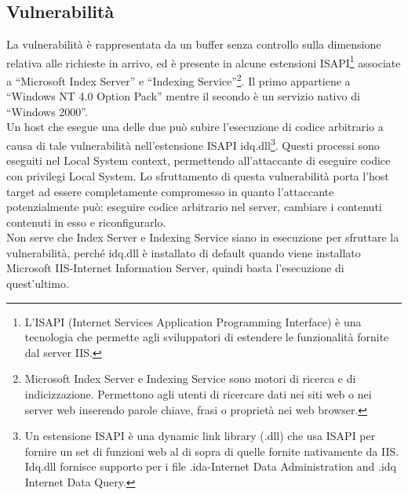 \subsection{Vulnerabilità}
La vulnerabilità è rappresentata da un buffer senza controllo sulla dimensione relativa alle richieste in arrivo, ed è presente in alcune estensioni ISAPI\footnote{L’ISAPI (Internet Services Application Programming Interface) è una tecnologia che permette agli sviluppatori di estendere le funzionalità fornite dal server IIS.} associate a “Microsoft Index Server” e “Indexing Service”\footnote{Microsoft Index Server e Indexing Service sono motori di ricerca e di indicizzazione. Permettono agli utenti di ricercare dati nei siti web o nei server web inserendo parole chiave, frasi o proprietà nei web browser.}. Il primo appartiene a “Windows NT 4.0 Option Pack” mentre il secondo è un servizio nativo di “Windows 2000”.\\
Un host che esegue una delle due può subire l’esecuzione di codice arbitrario a causa di tale vulnerabilità nell’estensione ISAPI idq.dll\footnote{Un estensione ISAPI è una dynamic link library (.dll) che usa ISAPI per fornire un set di funzioni web al di sopra di quelle fornite nativamente da IIS.\\
Idq.dll fornisce supporto per i file .ida-Internet Data Administration and .idq Internet Data Query.}. Questi processi sono eseguiti nel Local System context, permettendo all’attaccante di eseguire codice con privilegi Local System. Lo sfruttamento di questa vulnerabilità porta l’host target ad essere completamente compromesso in quanto l’attaccante potenzialmente può: eseguire codice arbitrario nel server, cambiare i contenuti contenuti in esso e riconfigurarlo.\\
Non serve che Index Server e Indexing Service siano in esecuzione per sfruttare la vulnerabilità, perché idq.dll è installato di default quando viene installato Microsoft IIS-Internet Information Server, quindi basta l’esecuzione di quest’ultimo.\\

